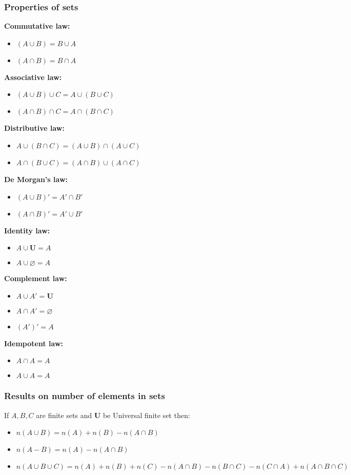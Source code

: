 \documentclass[twocolumn, 10pt]{article}
\begin{document}
\subsubsection{Properties of sets}
\textbf{Commutative law:}
\begin{itemize}
\item $(A \cup B)=B \cup A$
\item $(A \cap B)= B \cap A$
\end{itemize}
\textbf{Associative law:}
\begin{itemize}
\item $(A \cup B) \cup C=A \cup (B \cup C)$
\item $(A \cap B) \cap C=A \cap (B \cap C)$
\end{itemize}
\textbf{Distributive law:}
\begin{itemize}
\item $A \cup (B \cap C)=(A \cup B) \cap (A \cup C)$
\item $A \cap (B \cup C)=(A \cap B) \cup (A \cap C)$
\end{itemize}
\textbf{De Morgan's law:}
\begin{itemize}
\item $(A \cup B)' = A' \cap B'$
\item $(A \cap B)' = A' \cup B'$
\end{itemize}
\textbf{Identity law:}
\begin{itemize}
\item $A \cup \mathbf{U}=A$
\item $A \cup \varnothing=A$
\end{itemize}
\textbf{Complement law:}
\begin{itemize}
\item $A \cup A' = \mathbf{U}$
\item $A \cap A'= \varnothing$
\item $(A')'=A$
\end{itemize}
\textbf{Idempotent law:}
\begin{itemize}
\item $A \cap A=A$
\item $A \cup A=A$
\end{itemize}
\subsubsection{Results on number of elements in sets}
If $A,B,C$ are finite sets and $\mathbf{U}$ be Universal finite set then:
\begin{itemize}
\item $n(A \cup B)= n(A) + n(B) -n(A \cap B)$
\item $n(A-B)=n(A)-n(A \cap B)$
\item $n(A \cup B \cup C)=n(A)+n(B)+n(C)-n(A \cap B)-n(B \cap C)-n(C \cap A)+n(A \cap B \cap C)$
\end{itemize}
\end{document}
